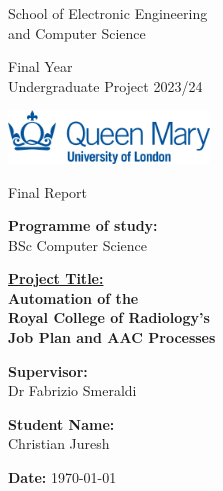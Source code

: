 

\setlength{\columnsep}{1cm}
\setlength{\columnseprule}{1pt}
\begin{titlepage}
\begin{multicols*}{2}

\noindent
School of Electronic Engineering 
\\and Computer Science

\vfill

\noindent
Final Year 
\\Undergraduate Project 2023/24

\vspace{1cm}
\noindent
\includegraphics[width=0.4\textwidth]{images/qmul-logo.jpg}  

\columnbreak

\noindent
Final Report

\vfill

\noindent
\textbf{Programme of study:}
\\BSc Computer Science

\vfill
\noindent
\underline{\textbf{Project Title:}}
\large
\\\textbf{Automation of the \\Royal College of Radiology’s \\Job Plan and AAC Processes}

\normalsize
\vfill
\noindent
\textbf{Supervisor:}
\\Dr Fabrizio Smeraldi

\vfill
\noindent
\textbf{Student Name:}
\\Christian Juresh

\vspace{0pt plus 2fill} 

\noindent
\textbf{Date:} \today

\end{multicols*}
\end{titlepage}